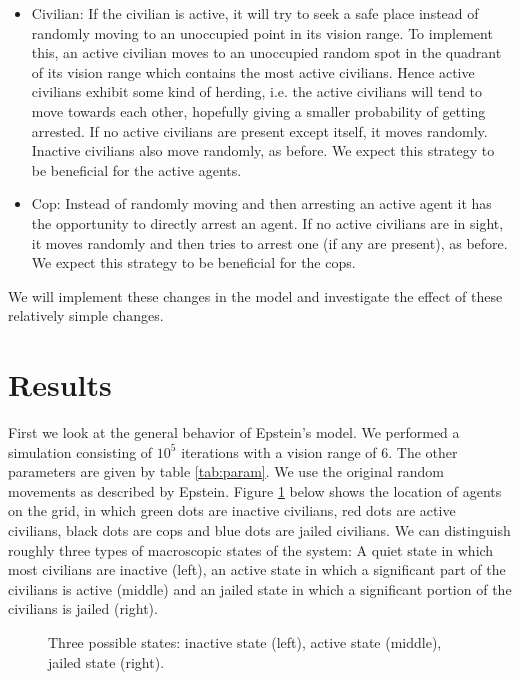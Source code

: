 \documentclass[11pt,a4paper,onecolumn]{article}
\begin{document}
\begin{itemize}
\item
  Civilian: If the civilian is active, it will try to seek a safe place instead of randomly moving to an unoccupied point in its vision range. To implement this, an active civilian moves to an unoccupied random spot in the quadrant of its vision range which contains the most active civilians. Hence active civilians exhibit some kind of herding, i.e. the active civilians will tend to move towards each other, hopefully giving a smaller probability of getting arrested. If no active civilians are present except itself, it moves randomly. Inactive civilians also move randomly, as before. We expect this strategy to be beneficial for the active agents.
\item
  Cop: Instead of randomly moving and then arresting an active agent it has the opportunity to directly arrest an agent. If no active civilians are in sight, it moves randomly and then tries to arrest one (if any are present), as before. We expect this strategy to be beneficial for the cops.
\end{itemize}

We will implement these changes in the model and investigate the effect of these relatively simple changes.

\section{Results}
First we look at the general behavior of Epstein's model. We performed a simulation consisting of $10^5$ iterations with a vision range of 6. The other parameters are given by table \ref{tab:param}. We use the original random movements as described by Epstein. Figure \ref{fig:sample} below shows the location of agents on the grid, in which green dots are inactive civilians, red dots are active civilians, black dots are cops and blue dots are jailed civilians. We can distinguish roughly three types of macroscopic states of the system: A quiet state in which most civilians are inactive (left), an active state in which a significant part of the civilians is active (middle) and an jailed state in which a significant portion of the civilians is jailed (right).

\begin{figure}[H]
  \centering
  \caption{Three possible states: inactive state (left), active state (middle), jailed state (right).}
  \label{fig:sample}
\end{figure}
\end{document}
